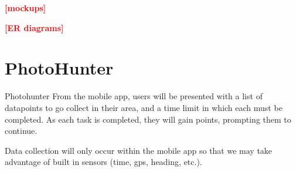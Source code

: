 \documentclass[aspectratio=169]{beamer}
\newcommand{\todo}[1]{\textcolor{red}{\textbf{[#1]}}}
\begin{document}
\begin{frame}
  \todo{mockups}
\end{frame}

\begin{frame}
  \todo{ER diagrams}
\end{frame}

\section{PhotoHunter}

\begin{frame}{Photohunter}
  From the mobile app, users will be presented with a list of
  datapoints
  to go collect in their area, and a time limit in which each must be
  completed. As each task is completed, they will gain points,
  prompting
  them to continue.

  Data collection will only occur within the mobile app so that we may
  take advantage of built in sensors (time, gps, heading, etc.).
\end{frame}
\end{document}
